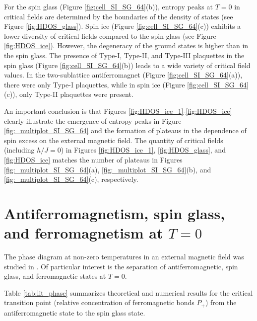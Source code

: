 \documentclass[preprint,12pt]{elsarticle}
\begin{document}
	For the spin glass (Figure \ref{fig:cell_SI_SG_64}(b)), entropy peaks at $T = 0$ in critical fields are determined by the boundaries of the density of states (see Figure \ref{fig:HDOS_glass}).
	Spin ice (Figure \ref{fig:cell_SI_SG_64}(c)) exhibits a lower diversity of critical fields compared to the spin glass (see Figure \ref{fig:HDOS_ice}). However, the degeneracy of the ground states is higher than in the spin glass.
	The presence of Type-I, Type-II, and Type-III plaquettes in the spin glass (Figure \ref{fig:cell_SI_SG_64}(b)) leads to a wide variety of critical field values. In the two-sublattice antiferromagnet (Figure \ref{fig:cell_SI_SG_64}(a)), there were only Type-I plaquettes, while in spin ice (Figure \ref{fig:cell_SI_SG_64}(c)), only Type-II plaquettes were present.
	
	An important conclusion is that Figures \ref{fig:HDOS_ice_1}-\ref{fig:HDOS_ice} clearly illustrate the emergence of entropy peaks in Figure \ref{fig:_multiplot_SI_SG_64} and the formation of plateaus in the dependence of spin excess on the external magnetic field.  
	The quantity of critical fields (including $h/J=0$) in Figures \ref{fig:HDOS_ice_1}, \ref{fig:HDOS_glass}, and \ref{fig:HDOS_ice} matches the number of plateaus in Figures \ref{fig:_multiplot_SI_SG_64}(a), \ref{fig:_multiplot_SI_SG_64}(b), and \ref{fig:_multiplot_SI_SG_64}(c), respectively.
	
	
	\section{Antiferromagnetism, spin glass, and ferromagnetism at $T = 0$}
	
	The phase diagram at non-zero temperatures in an external magnetic field was studied in \cite{trukhin2024thermodynamic}. Of particular interest is the separation of antiferromagnetic, spin glass, and ferromagnetic states at $T = 0$.
	
	Table \ref{tab:lit_phase} summarizes theoretical and numerical results for the critical transition point (relative concentration of ferromagnetic bonds $P_+$) from the antiferromagnetic state to the spin glass state.
	
\end{document}
